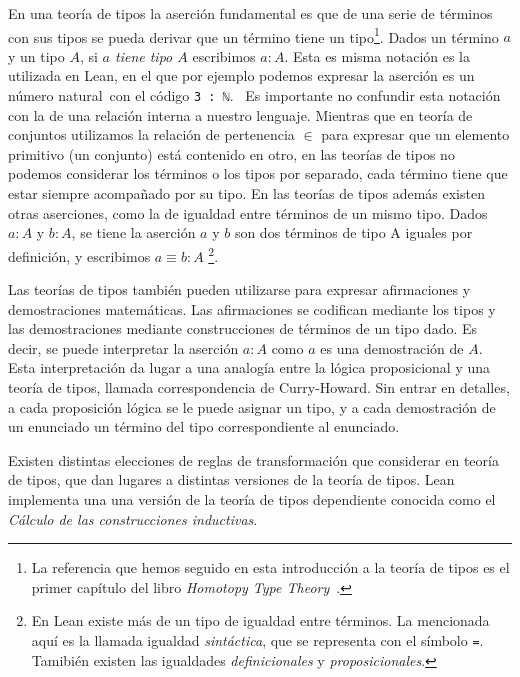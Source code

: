 En una teoría de tipos la aserción fundamental es \guillemotleft que de una serie de
términos con sus tipos se pueda derivar que un término tiene un
tipo\guillemotright\footnote{La referencia que hemos seguido en esta introducción a la teoría
	de tipos es el primer capítulo del libro \textit{Homotopy Type
		Theory}~\cite{HomotopyTypeTheory}.}. Dados un término $a$ y un tipo $A$, si
\textit{$a$ tiene tipo $A$} escribimos $a:A$. Esta es misma notación es la
utilizada en Lean, en el que por ejemplo podemos expresar la aserción
 es un número natural\guillemotright\ con el código \lstinline{3 : ℕ}.
\
Es importante no confundir esta notación con la de una relación interna a
nuestro lenguaje. Mientras que en teoría de conjuntos utilizamos la relación de
pertenencia $\in$ para expresar que un elemento primitivo (un conjunto) está
contenido en otro, en las teorías de tipos no podemos considerar los términos o
los tipos por separado, cada término tiene que estar siempre acompañado por su
tipo. En las teorías de tipos además existen otras aserciones, como la de
igualdad entre términos de un mismo tipo. Dados $a:A$ y $b:A$, se tiene la
aserción \guillemotleft $a$ y $b$ son dos términos de tipo A iguales por
definición\guillemotright, y escribimos $a\equiv b : A$ \footnote{En
	Lean existe más de un tipo de igualdad entre términos. La mencionada
	aquí es la llamada igualdad \textit{sintáctica}, que se representa con el
	símbolo \lstinline{=}. Tamibién existen las igualdades \textit{definicionales} y
\textit{proposicionales}.}.

Las teorías de tipos también pueden utilizarse para expresar afirmaciones y
demostraciones matemáticas. Las afirmaciones se codifican mediante los tipos y
las demostraciones mediante construcciones de términos de un tipo dado. Es
decir, se puede interpretar la aserción $a : A$ como \guillemotleft$a$ es una
demostración de $A$\guillemotright. Esta interpretación da lugar a una analogía
entre la lógica proposicional y una teoría de tipos, llamada correspondencia de
Curry-Howard. Sin entrar en detalles, a cada proposición lógica se le puede
asignar un tipo, y a cada demostración de un enunciado un término del tipo
correspondiente al enunciado.

Existen distintas elecciones de reglas de transformación que considerar en
teoría de tipos, que dan lugares a distintas versiones de la teoría de tipos.
Lean implementa una una versión de la teoría de tipos dependiente conocida como
el \textit{Cálculo de las construcciones inductivas}.

